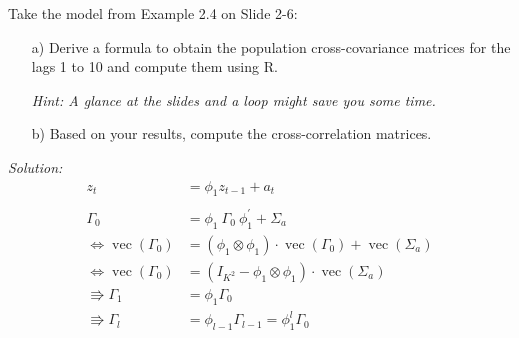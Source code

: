 \documentclass[12pt,a4paper]{article}
\renewcommand{\vec}{\operatorname{vec}}
\begin{document}
Take the model from Example 2.4 on Slide 2-6:

\begin{itemize}
  \item[a)] Derive a formula to obtain the population cross-covariance matrices for the lags 1 to 10 and compute them using R.
  \item[] \textit{Hint: A glance at the slides and a loop might save you some time.}
  \item[b)] Based on your results, compute the cross-correlation matrices.
\end{itemize}

\emph{Solution:}\\

\begin{align*}
  z_t & = \phi_1 z_{t-1} + a_t\\
  \\
  \Gamma_0 & = \phi_1  \ \Gamma_0 \ \phi_1^{'} + \Sigma_a\\
  \Leftrightarrow \vec(\Gamma_0) &= (\phi_1 \otimes \phi_1) \cdot \vec(\Gamma_0) + \vec(\Sigma_a) \\
  \Leftrightarrow \vec(\Gamma_0) &= (I_{K^2} - \phi_1 \otimes \phi_1) \cdot \vec(\Sigma_a) \\
 \Rrightarrow \Gamma_1 & = \phi_1 \Gamma_0\\
 \Rrightarrow \Gamma_l & = \phi_{l-1} \Gamma_{l-1} = \phi_1^{l} \Gamma_0\\
\end{align*}
\end{document}

